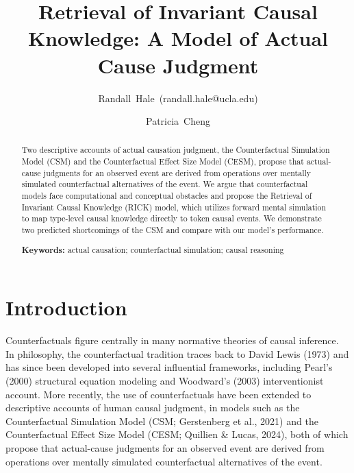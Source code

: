 \documentclass[10pt,letterpaper]{article}
\title{Retrieval of Invariant Causal Knowledge: A Model of Actual Cause Judgment}
\author[1]{\mbox{Randall Hale (randall.hale@ucla.edu)}}
\author[1]{\mbox{Patricia Cheng}}
\affil[1]{Department of Psychology, UCLA}
\begin{document}
\maketitle

\begin{abstract}
Two descriptive accounts of actual causation judgment, the Counterfactual Simulation Model (CSM) and the Counterfactual Effect Size Model (CESM), propose that actual-cause judgments for an observed event are derived from operations over mentally simulated counterfactual alternatives of the event. We argue that counterfactual models face computational and conceptual obstacles and propose the Retrieval of Invariant Causal Knowledge (RICK) model, which utilizes forward mental simulation to map type-level causal knowledge directly to token causal events. We demonstrate two predicted shortcomings of the CSM and compare with our model's performance.

\textbf{Keywords:}
actual causation; counterfactual simulation; causal reasoning
\end{abstract}

\section{Introduction}

Counterfactuals figure centrally in many normative theories of causal inference. In philosophy, the counterfactual tradition traces back to David Lewis (1973) and has since been developed into several influential frameworks, including Pearl’s (2000) structural equation modeling and Woodward’s (2003) interventionist account. More recently, the use of counterfactuals have been extended to descriptive accounts of human causal judgment, in models such as the Counterfactual Simulation Model (CSM; Gerstenberg et al., 2021) and the Counterfactual Effect Size Model (CESM; Quillien \& Lucas, 2024), both of which propose that actual-cause judgments for an observed event are derived from operations over mentally simulated counterfactual alternatives of the event.
\end{document}
